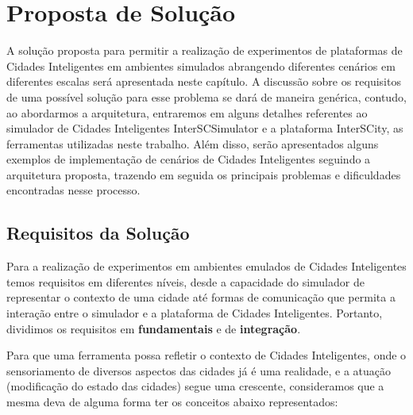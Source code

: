 \chapter{Proposta de Solução}
\label{cap:proposta}

A solução proposta para permitir a realização de experimentos de plataformas de Cidades Inteligentes em ambientes simulados abrangendo diferentes cenários em diferentes escalas será
apresentada neste capítulo.
A discussão sobre os requisitos de uma possível solução para esse problema se dará de maneira genérica, contudo, ao abordarmos a arquitetura, entraremos em alguns detalhes referentes ao
simulador de Cidades Inteligentes InterSCSimulator e a plataforma InterSCity, as ferramentas utilizadas neste trabalho.
Além disso, serão apresentados alguns exemplos de implementação de cenários de Cidades Inteligentes seguindo a arquitetura proposta, trazendo em seguida os principais problemas e
dificuldades encontradas nesse processo.

\section{Requisitos da Solução}
\label{sec:requisitos}

Para a realização de experimentos em ambientes emulados de Cidades Inteligentes temos requisitos em diferentes níveis, desde a capacidade do simulador de representar o contexto
de uma cidade até formas de comunicação que permita a interação entre o simulador e a plataforma de Cidades Inteligentes.
Portanto, dividimos os requisitos em \textbf{fundamentais} e de \textbf{integração}.

Para que uma ferramenta possa refletir o contexto de Cidades Inteligentes, onde o sensoriamento de diversos aspectos das cidades já é uma realidade, e a atuação (modificação do estado
das cidades) segue uma crescente, consideramos que a mesma deva de alguma forma ter os conceitos abaixo representados:

